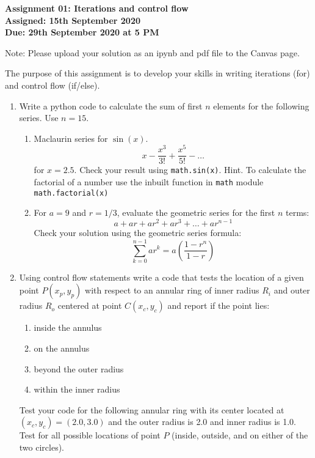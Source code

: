 \documentclass[a4paper,12pt]{article}
\begin{document}
\begin{centering}
	\textbf{
		Assignment 01: Iterations and control flow\\
		Assigned: 15th September 2020\\
		Due: 29th September 2020 at 5 PM\\
	}
\end{centering}


Note: Please upload your solution as an ipynb and pdf file to the Canvas page.

\vspace{1em}
 
 The purpose of this assignment is to develop your skills in writing iterations (for) and control flow (if/else).
 
\begin{enumerate}
	\item Write a python code to calculate the sum of first $n$ elements for the following series. Use $n = 15$.
	\begin{enumerate}
		\item Maclaurin series for $\sin(x)$. 
		\begin{equation*}
		x - \frac{x^3}{3!} + \frac{x^5}{5!} - \dots
		\end{equation*}
		for $x = 2.5$. Check your result using \verb|math.sin(x)|.	Hint. To calculate the factorial of a number use the inbuilt function in \verb|math| module \verb|math.factorial(x)|
		\item For $a = 9$ and $r = 1/3$, evaluate the geometric series for the first $n$ terms:
		\begin{equation*}
		a + ar + ar^2 + ar^3 + \dots + ar^{n - 1}
		\end{equation*}
		Check your solution using the geometric series formula:
		\begin{equation*}
			\sum_{k = 0}^{n - 1} ar^k = a \left(\frac{1 -r^n}{1-r}\right)
		\end{equation*}
		
	\end{enumerate}


	
	\item Using control flow  statements write a code that tests the location of a given point $P(x_p, y_p)$ with respect to an annular ring of inner radius $R_i$ and outer radius $R_o$ centered at point $C (x_c, y_c)$ and report if the point lies:
	\begin{enumerate}
		\item inside the annulus
		\item on the annulus
		\item beyond the outer radius
		\item within the inner radius
	\end{enumerate}
	 Test your code for the following annular ring with its center located at $(x_c, y_c) = (2.0, 3.0)$ and the outer radius is 2.0 and inner radius is 1.0. Test for all possible locations of point $P$ (inside, outside, and on either
	 of the two circles).
	

\end{enumerate}
\end{document}

